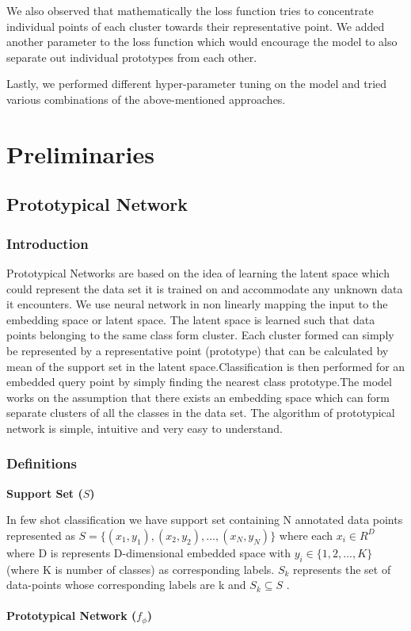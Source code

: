 We also observed that mathematically the loss function tries to concentrate individual points of each cluster towards their representative point. We added another parameter to the loss function which would encourage the model to also separate out individual prototypes from each other.

Lastly, we performed different hyper-parameter tuning on the model and tried various combinations of the above-mentioned approaches.

\newpage

\section{Preliminaries}
\subsection{Prototypical Network}
\subsubsection{Introduction}
Prototypical Networks are based on the idea of learning the latent space which could represent the data set it is trained on and accommodate any unknown data it encounters. We use neural network in non linearly mapping the input to the embedding space or latent space. The latent space is learned such that data points belonging to the same class form cluster. Each cluster formed can simply be represented by a representative point (prototype) that can be calculated by mean of the support set in the latent space.Classification is then performed for an embedded query point by simply finding the nearest class prototype.The model works on the assumption that there exists an embedding space which can form separate clusters of all the classes in the data set. The algorithm of prototypical network is simple, intuitive and very easy to understand.
\subsubsection{Definitions}
\textbf{Support Set (\(S\))}

In few shot classification we have support set containing N annotated data points represented as \(S = \{(x_1,y_1),(x_2,y_2),...,(x_N,y_N)\}\) where each \(x_i \in R^D\) where D is represents D-dimensional embedded space with \(y_i \in \{1,2,...,K\}\) (where K is number of classes) as corresponding labels. \(S_k\) represents the set of data-points whose corresponding labels are k and \(S_k \subseteq S\) .\\\\
\textbf{Prototypical Network (\(f_\phi\))}

